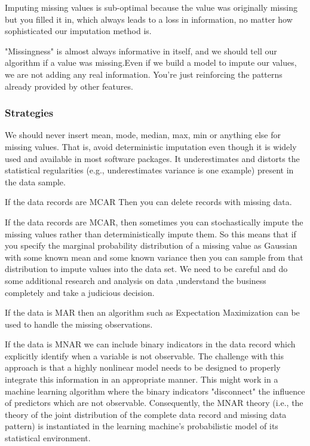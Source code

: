 \documentclass[11pt,en]{elegantpaper}
\begin{document}
Imputing missing values is sub-optimal because the value was originally missing but you filled it in, which always leads to a loss in information, no matter how sophisticated our imputation method is.

"Missingness" is almost always informative in itself, and we should tell our algorithm if a value was missing.Even if we build a model to impute our values, we are not adding any real information. You’re just reinforcing the patterns already provided by other features.

\subsubsection{Strategies}

We should never insert mean, mode, median, max, min or anything else for missing values. That is, avoid deterministic imputation even though it is widely used and available in most software packages. It underestimates and distorts the statistical regularities (e.g., underestimates variance is one example) present in the data sample.

If the data records are MCAR Then you can delete records with missing data.

If the data records are MCAR, then sometimes you can stochastically impute the missing values rather than deterministically impute them. So this means that if you specify the marginal probability distribution of a missing value as Gaussian with some known mean and some known variance then you can sample from that distribution to impute values into the data set. We need to be careful and do some additional research and analysis on data ,understand the business completely and take a judicious decision.

If the data is MAR then an algorithm such as Expectation Maximization can be used to handle the missing observations.

If the data is MNAR we can include binary indicators in the data record which explicitly identify when a variable is not observable. The challenge with this approach is that a highly nonlinear model needs to be designed to properly integrate this information in an appropriate manner. This might work in a machine learning algorithm where the binary indicators "disconnect" the influence of predictors which are not observable. Consequently, the MNAR theory (i.e., the theory of the joint distribution of the complete data record and missing data pattern) is instantiated in the learning machine's probabilistic model of its statistical environment.
\end{document}
